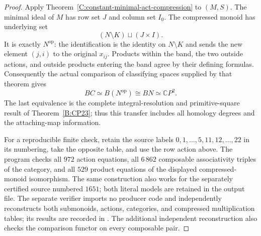 \begin{proof}
Apply Theorem~\ref{C:constant-minimal-act-compression} to $(M,S)$.
The minimal ideal of $M$ has row set $J$ and column set $I_0$.
The compressed monoid has underlying set
\[
 (N\setminus K)\sqcup(J\times I).
\]
It is exactly $N^{\mathrm{op}}$: the identification is the identity
on $N\setminus K$ and sends the new element $(j,i)$ to the original
$x_{ij}$.  Products within the band, the two outside actions, and
outside products entering the band agree by their defining
formulas.  Consequently the actual comparison of classifying
spaces supplied by that theorem gives
\[
 BC\simeq B(N^{\mathrm{op}})\cong BN\simeq\mathbb CP^2.
\]
The last equivalence is the complete integral-resolution and
primitive-square result of Theorem~\ref{B:CP23}; thus this transfer
includes all homology degrees and the attaching-map information.

For a reproducible finite check, retain the source labels
$0,1,\ldots,5,11,12,\ldots,22$ in its numbering, take the opposite
table, and use the row action above.  The program
 checks all $972$ action equations,
all $6\,862$ composable associativity triples of the category,
and all $529$ product equations of the displayed compressed-monoid
isomorphism.  The same construction also works for the separately
certified source numbered $1651$; both literal models are retained
in the output file.  The separate verifier
 imports no producer code and
independently reconstructs both submonoids, actions, categories,
and compressed multiplication tables; its results are recorded in
.
The additional independent reconstruction
 also checks the comparison
functor on every composable pair.
\end{proof}
